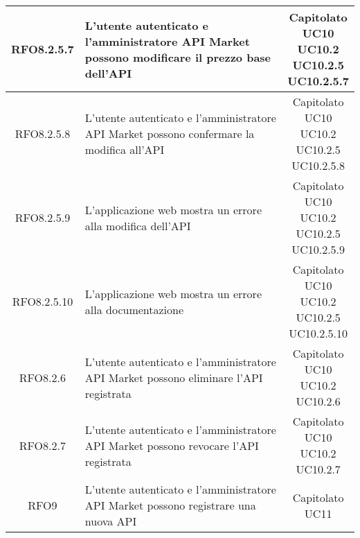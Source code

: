 \begin{longtable}{|c|p{8cm}|c|}
\hypertarget{RFO8.2.5.7}{RFO8.2.5.7} &  L'utente autenticato e l'amministratore API Market possono modificare il prezzo base dell'API & \makecell*{Capitolato\\UC10\\UC10.2\\UC10.2.5\\UC10.2.5.7} \\
\hline

\hypertarget{RFO8.2.5.8}{RFO8.2.5.8} &  L'utente autenticato e l'amministratore API Market possono confermare la modifica all'API & \makecell*{Capitolato\\UC10\\UC10.2\\UC10.2.5\\UC10.2.5.8} \\
\hline

\hypertarget{RFO8.2.5.9}{RFO8.2.5.9} &  L'applicazione web mostra un errore alla modifica dell'API & \makecell*{Capitolato\\UC10\\UC10.2\\UC10.2.5\\UC10.2.5.9} \\
\hline

\hypertarget{RFO8.2.5.10}{RFO8.2.5.10} &  L'applicazione web mostra un errore alla documentazione & \makecell*{Capitolato\\UC10\\UC10.2\\UC10.2.5\\UC10.2.5.10} \\
\hline

\hypertarget{RFO8.2.6}{RFO8.2.6} &  L'utente autenticato e l'amministratore API Market possono eliminare l'API registrata & \makecell*{Capitolato\\UC10\\UC10.2\\UC10.2.6} \\
\hline

\hypertarget{RFO8.2.7}{RFO8.2.7} &  L'utente autenticato e l'amministratore API Market possono revocare l'API registrata & \makecell*{Capitolato\\UC10\\UC10.2\\UC10.2.7} \\
\hline

\hypertarget{RFO9}{RFO9} &  L'utente autenticato e l'amministratore API Market possono registrare una nuova API & \makecell*{Capitolato\\UC11} \\
\hline


\end{longtable}

